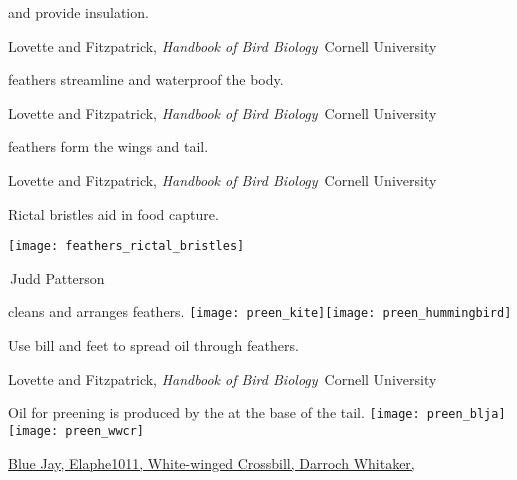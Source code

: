 \documentclass[t]{beamer}
\begin{document}
%
{
\begin{frame}[t,plain]{ and  provide insulation.}

\vfilll

\tiny \hfill Lovette and Fitzpatrick, \textit{Handbook of Bird Biology} \textcopyright\,Cornell University

\end{frame}
}
%
{
\begin{frame}[t,plain]{ feathers streamline and waterproof the body.}

\vfilll

\tiny \hfill Lovette and Fitzpatrick, \textit{Handbook of Bird Biology} \textcopyright\,Cornell University

\end{frame}
}
%
{
\begin{frame}[t,plain]{ feathers form the wings and tail.}

\vfilll

\tiny \hfill Lovette and Fitzpatrick, \textit{Handbook of Bird Biology} \textcopyright\,Cornell University

\end{frame}
}
%
\begin{frame}[t,plain]{Rictal bristles aid in food capture.}

\centering

\texttt{[image: feathers\_rictal\_bristles]}

\vfilll

\tiny \hfill \textcopyright\,Judd Patterson
\end{frame}
%


\begin{frame}{ cleans and arranges feathers.}
	\texttt{[image: preen\_kite]}\hfill \texttt{[image: preen\_hummingbird]}
	
	Use bill and feet to spread oil through feathers.
	
	\tinyfill Lovette and Fitzpatrick, \textit{Handbook of Bird Biology} \textcopyright\,Cornell University
\end{frame}

\begin{frame}{Oil for preening is produced by the  at the base of the tail.}
	\texttt{[image: preen\_blja]}\hfill \texttt{[image: preen\_wwcr]}
	
	
	\vfilll
	
	\tiny \href{https://commons.wikimedia.org/w/index.php?curid=92130030}{Blue Jay, Elaphe1011, } \hfill
	\href{https://commons.wikimedia.org/w/index.php?curid=14726898}{White-winged Crossbill, Darroch Whitaker, }
\end{frame}
\end{document}
